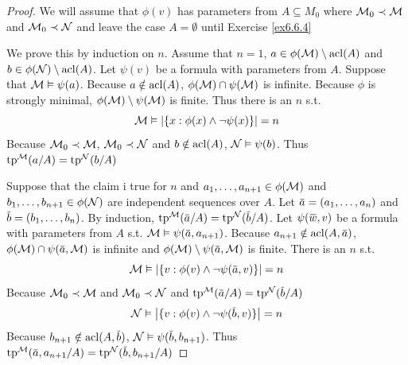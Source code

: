 \documentclass[11pt]{article}
\begin{document}
\begin{proof}
We will assume that \(\phi(v)\) has parameters from \(A\subseteq M_0\) where \(\mathcal{M}_0\prec\mathcal{M}\) and \(\mathcal{M}_0\prec\mathcal{N}\) and
leave the case \(A=\emptyset\) until Exercise \ref{ex6.6.4}

We prove this by induction on \(n\). Assume that \(n=1\), \(a\in\phi(\mathcal{M})\setminus\operatorname{acl}(A)\)
and \(b\in\phi(\mathcal{N})\setminus\operatorname{acl}(A)\). Let \(\psi(v)\) be a formula with parameters from \(A\). Suppose
that \(\mathcal{M}\vDash\psi(a)\). Because \(a\notin\operatorname{acl}(A)\), \(\phi(\mathcal{M})\cap\psi(\mathcal{M})\) is infinite. Because \(\phi\) is strongly
minimal, \(\phi(\mathcal{M})\setminus\psi(\mathcal{M})\) is finite. Thus there is an \(n\) s.t.
\begin{equation*}
\calm\vDash\abs{\{x:\phi(x)\wedge\neg\psi(x)\}}=n
\end{equation*}
Because \(\mathcal{M}_0\prec\mathcal{M}\), \(\mathcal{M}_0\prec\mathcal{N}\) and \(b\notin\operatorname{acl}(A)\), \(\mathcal{N}\vDash\psi(b)\).
Thus \(\operatorname{tp}^{\mathcal{M}}(a/A)=\operatorname{tp}^{\mathcal{N}}(b/A)\)

Suppose that the claim i true for \(n\) and \(a_1,\dots,a_{n+1}\in\phi(\mathcal{M})\) and \(b_1,\dots,b_{n+1}\in\phi(\mathcal{N})\) are
independent sequences over \(A\). Let \(\bara=(a_1,\dots,a_n)\) and \(\barb=(b_1,\dots,b_n)\). By
induction, \(\tp^{\calm}(\bara/A)=\tp^{\caln}(\barb/A)\). Let \(\psi(\barw,v)\) be a formula with
parameters from \(A\) s.t. \(\calm\vDash\psi(\bara,a_{n+1})\).
Because \(a_{n+1}\notin\acl(A,\bara)\), \(\phi(\calm)\cap\psi(\bara,\calm)\) is infinite and \(\phi(\calm)\setminus\psi(\bara,\calm)\) is
finite. There is an \(n\) s.t.
\begin{equation*}
\calm\vDash\abs{\{v:\phi(v)\wedge\neg\psi(\bara,v)\}}=n
\end{equation*}
Because \(\mathcal{M}_0\prec\mathcal{M}\) and \(\mathcal{M}_0\prec\mathcal{N}\) and \(\tp^{\calm}(\bara/A)=\tp^{\caln}(\barb/A)\)
\begin{equation*}
\caln\vDash\abs{\{v:\phi(v)\wedge\neg\psi(\barb,v)\}}=n
\end{equation*}
Because \(b_{n+1}\notin\acl(A,\barb)\), \(\caln\vDash\psi(\barb,b_{n+1})\).
Thus \(\tp^{\calm}(\bara,a_{n+1}/A)=\tp^{\caln}(\barb,b_{n+1}/A)\)
\end{proof}
\end{document}
